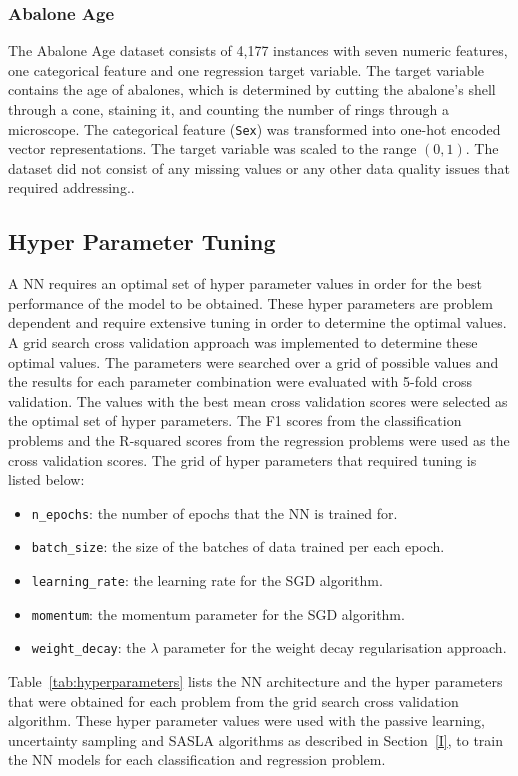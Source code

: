 \documentclass[conference]{IEEEtran}
\begin{document}
	\subsubsection{Abalone Age}
	The Abalone Age dataset consists of 4,177 instances with seven numeric features, one categorical feature and one regression target variable. The target variable contains the age of abalones, which is determined by cutting the abalone's shell through a cone, staining it, and counting the number of rings through a microscope. The categorical  feature (\texttt{Sex}) was transformed into one-hot encoded vector representations. The target variable was scaled to the range $(0, 1)$. The dataset did not consist of any missing values or any other data quality issues that required addressing..
	
	\subsection{Hyper Parameter Tuning}
	A NN requires an optimal set of hyper parameter values in order for the best performance of the model to be obtained. These hyper parameters are problem dependent and require extensive tuning in order to determine the optimal values. A grid search cross validation approach was implemented to determine these optimal values. The parameters were searched over a grid of possible values and the results for each parameter combination were evaluated with 5-fold cross validation. The values with the best mean cross validation scores were selected as the optimal set of hyper parameters. The F1 scores from the classification problems and the R-squared scores from the regression problems were used as the cross validation scores. The grid of hyper parameters that required tuning is listed below:
	\begin{itemize}
		\item \texttt{n\_epochs}: the number of epochs that the NN is trained for.
		\item \texttt{batch\_size}: the size of the batches of data trained per each epoch.
		\item \texttt{learning\_rate}: the learning rate for the SGD algorithm.
		\item \texttt{momentum}: the momentum parameter for the SGD algorithm.
		\item \texttt{weight\_decay}: the $\lambda$ parameter for the weight decay regularisation approach.
	\end{itemize}
	Table~\ref{tab:hyperparameters} lists the NN architecture and the hyper parameters that were obtained for each problem from the grid search cross validation algorithm. These hyper parameter values were used with the passive learning, uncertainty sampling and SASLA algorithms as described in Section~\ref{I}, to train the NN models for each classification and regression problem.
\end{document}
